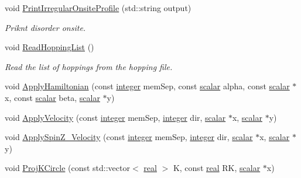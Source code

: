\begin{DoxyCompactItemize}
void \hyperlink{classNumCal_1_1Lattice_ab7c36dff03f863c8ddc416b66dba9a73}{Print\+Irregular\+Onsite\+Profile} (std\+::string output)
\begin{DoxyCompactList}\small\item\em Priknt disorder onsite. \end{DoxyCompactList}\item 
void \hyperlink{classNumCal_1_1Lattice_a18e3c9f1f34f92de89609af54d5b35c4}{Read\+Hopping\+List} ()
\begin{DoxyCompactList}\small\item\em Read the list of hoppings from the hopping file. \end{DoxyCompactList}\item 
void \hyperlink{classNumCal_1_1Lattice_ac3faf5a66101d7fbbdf208d50707a16f}{Apply\+Hamiltonian} (const \hyperlink{namespaceNumCal_ae1031b42812e871d8f5bd9b7b15fc7d8}{integer} mem\+Sep, const \hyperlink{namespaceNumCal_a45f8f32ea0c2b926caa1ad763bd77c96}{scalar} alpha, const \hyperlink{namespaceNumCal_a45f8f32ea0c2b926caa1ad763bd77c96}{scalar} $\ast$x, const \hyperlink{namespaceNumCal_a45f8f32ea0c2b926caa1ad763bd77c96}{scalar} beta, \hyperlink{namespaceNumCal_a45f8f32ea0c2b926caa1ad763bd77c96}{scalar} $\ast$y)
\item 
void \hyperlink{classNumCal_1_1Lattice_ac9688b079c290ea2562a2c22c956ee38}{Apply\+Velocity} (const \hyperlink{namespaceNumCal_ae1031b42812e871d8f5bd9b7b15fc7d8}{integer} mem\+Sep, \hyperlink{namespaceNumCal_ae1031b42812e871d8f5bd9b7b15fc7d8}{integer} dir, \hyperlink{namespaceNumCal_a45f8f32ea0c2b926caa1ad763bd77c96}{scalar} $\ast$x, \hyperlink{namespaceNumCal_a45f8f32ea0c2b926caa1ad763bd77c96}{scalar} $\ast$y)
\item 
void \hyperlink{classNumCal_1_1Lattice_a309264d8e819fbdda3ca043aaccec793}{Apply\+Spin\+Z\+\_\+\+Velocity} (const \hyperlink{namespaceNumCal_ae1031b42812e871d8f5bd9b7b15fc7d8}{integer} mem\+Sep, \hyperlink{namespaceNumCal_ae1031b42812e871d8f5bd9b7b15fc7d8}{integer} dir, \hyperlink{namespaceNumCal_a45f8f32ea0c2b926caa1ad763bd77c96}{scalar} $\ast$x, \hyperlink{namespaceNumCal_a45f8f32ea0c2b926caa1ad763bd77c96}{scalar} $\ast$y)
\item 
void \hyperlink{classNumCal_1_1Lattice_ae18a5984df3d9300f56b06c769a208db}{Proj\+K\+Circle} (const std\+::vector$<$ \hyperlink{namespaceNumCal_ac10564761316cff6fb75fe8bfccd6def}{real} $>$ K, const \hyperlink{namespaceNumCal_ac10564761316cff6fb75fe8bfccd6def}{real} R\+K, \hyperlink{namespaceNumCal_a45f8f32ea0c2b926caa1ad763bd77c96}{scalar} $\ast$x)
\item 

\end{DoxyCompactItemize}
